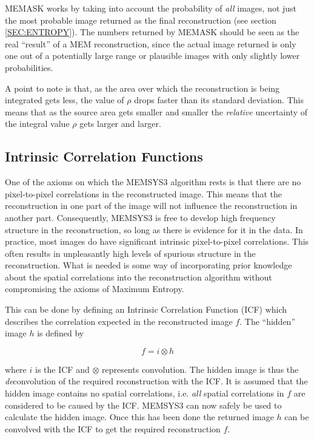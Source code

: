 MEMASK works by taking into account the probability of {\em all} images, not
just  the most probable image returned as the final reconstruction (see section
\ref  {SEC:ENTROPY}). The numbers returned by MEMASK should be seen as the real
``result'' of a MEM reconstruction, since the actual image returned is only one
out of a potentially large range or plausible images with only slightly lower
probabilities.

A point to note is that, as the area over which the reconstruction is being
integrated gets less, the value of $\rho$ drops faster than its standard
deviation. This means that as the source area gets smaller and smaller the
{\em relative} uncertainty of the integral value $\rho$ gets larger and larger.

\subsection {Intrinsic Correlation Functions}

One of the axioms on which the MEMSYS3 algorithm rests is that there are no
pixel-to-pixel correlations in the reconstructed image. This means that the
reconstruction in one part of the image will not influence the reconstruction
in  another part. Consequently, MEMSYS3 is free to develop high frequency
structure in the reconstruction, so long as there is evidence for it in the
data. In practice, most images do have significant intrinsic pixel-to-pixel
correlations. This often results in unpleasantly high levels of spurious
structure in the reconstruction. What is needed is some way of incorporating
prior knowledge about  the spatial correlations into the reconstruction
algorithm without compromising  the axioms of Maximum Entropy.

This can be done by defining an Intrinsic Correlation Function (ICF) which
describes the correlation expected in the reconstructed image $f$. The
``hidden'' image $h$ is defined by

\begin {equation}
 f = i \otimes h
\end {equation}

where $i$ is the ICF and $\otimes$ represents convolution. The hidden image is
thus the {\em de}convolution of the required reconstruction with the ICF. It is
assumed that the hidden image contains no spatial correlations, i.e. {\em all}
spatial correlations in $f$ are considered to be caused by the ICF. MEMSYS3 can
now safely be used to calculate the hidden image. Once this has been done the
returned image $h$ can be convolved with the ICF to get the required
reconstruction $f$.

